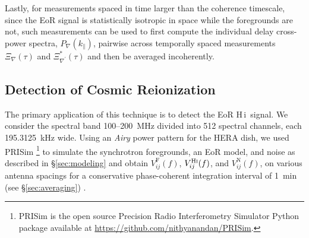\documentclass[
reprint,
superscriptaddress,
amsmath,
amssymb,
aps,
prd
]{revtex4-1}
\newcommand{\HI}{H\,{\sc i}}
\begin{document}
Lastly, for measurements spaced in time larger than the coherence timescale,  since the EoR signal is statistically isotropic in space while the foregrounds are not, such measurements can be used to first compute the individual delay cross-power spectra, $P_\nabla(k_\parallel)$, pairwise across temporally spaced measurements $\Xi_\nabla(\tau)$ and $\Xi_{\nabla^\prime}^*(\tau)$ and then be averaged incoherently. 


\subsection{Detection of Cosmic Reionization}\label{sec:EoR-detection}

The primary application of this technique is to detect the EoR \HI\ signal. We consider the spectral band 100--200~MHz divided into 512 spectral channels, each 195.3125~kHz wide. Using an {\it Airy} power pattern for the HERA dish, we used PRISim \footnote{PRISim is the open source Precision Radio Interferometry Simulator Python package available at \href{https://github.com/nithyanandan/PRISim}{https://github.com/nithyanandan/PRISim}.} to simulate the synchrotron foregrounds, an EoR model, and noise as described in \S\ref{sec:modeling} and obtain $V_{ij}^\textrm{F}(f)$, $V_{ij}^\textrm{H{\sc i}}(f)$, and $V_{ij}^\textrm{N}(f)$, on various antenna spacings for a conservative phase-coherent integration interval of 1~min (see \S\ref{sec:averaging}) \cite{car18}. %
\end{document}
